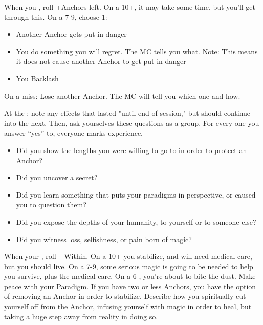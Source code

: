 \begin{multicols}{3}
  \SEPARATOR

  \begin{move}
    When you , roll +Anchors left. On a 10+, it may take some time, but you’ll get through this. On a 7-9, choose 1:

    \begin{itemize}
      \setlength\itemsep{0em}
    \item Another Anchor gets put in danger
    \item You do something you will regret. The MC tells you what. Note: This means it does not cause another Anchor to get put in danger
    \item You Backlash 
    \end{itemize}
On a miss: Lose another Anchor. The MC will tell you which one and how.

  \end{move}

  \columnbreak

  \begin{move}
    At the : note any effects that lasted "until end of session," but should continue into the next. Then, ask yourselves these questions as a group. For every one you answer “yes” to, everyone marks experience.

    \begin{itemize}
      \setlength\itemsep{0em}
    \item Did you show the lengths you were willing to go to in order to protect an Anchor?
    \item Did you uncover a secret?
    \item Did you learn something that puts your paradigms in perspective, or caused you to question them?
    \item Did you expose the depths of your humanity, to yourself or to someone else?
    \item Did you witness loss, selfishness, or pain born of magic?
    \end{itemize}

  \end{move}

  \SEPARATOR
  

  \begin{move}
    When your , roll +Within. On a 10+ you stabilize, and will need medical care, but you should live. On a 7-9, some serious magic is going to be needed to help you survive, plus the medical care. On a 6-, you’re about to bite the dust. Make peace with your Paradigm. If you have two or less Anchors, you have the option of removing an Anchor in order to stabilize. Describe how you spiritually cut yourself off from the Anchor, infusing yourself with magic in order to heal, but taking a huge step away from reality in doing so.


\end{move}
\end{multicols}
